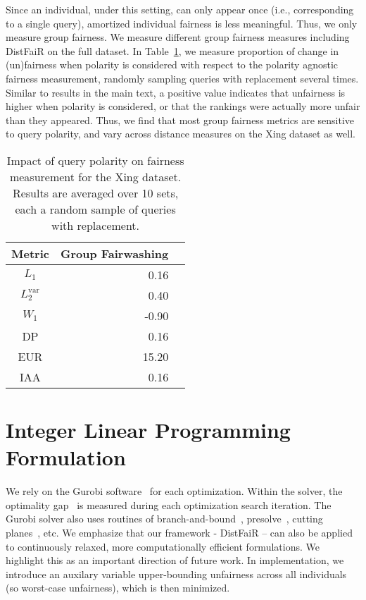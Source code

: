 Since an individual, under this setting, can only appear once (i.e., corresponding to a single query), amortized individual fairness is less meaningful. Thus, we only measure group fairness. We measure different group fairness measures including DistFaiR on the full dataset. In Table~\ref{tab:xing_dataset}, we measure proportion of change in (un)fairness when polarity is considered with respect to the polarity agnostic fairness measurement, randomly sampling queries with replacement several times.   Similar to results in the main text, a positive value indicates that unfairness is higher when polarity is considered, or that the rankings were actually more unfair than they appeared. Thus, we find that most group fairness metrics are sensitive to query polarity, and vary across distance measures on the Xing dataset as well.  

\begin{table}[!htp]\centering
\begin{tabular}{c|rr}
\toprule
\textbf{Metric} &\textbf{Group Fairwashing} \\\midrule
$L_1$ &0.16 \\
$L_2^{\text{var}}$ &0.40 \\
$W_1$ &-0.90 \\
DP &0.16 \\
EUR &15.20 \\
IAA &0.16 \\
\bottomrule
\end{tabular}
\caption{Impact of query polarity on fairness measurement for the Xing dataset. Results are averaged over 10 sets, each a random sample of queries with replacement.}\label{tab:xing_dataset}

\end{table}





\section{Integer Linear Programming Formulation}
\label{sec:ilp_appendix}
We rely on the Gurobi software~\cite{achterberg2019s} for each optimization. Within the solver, the optimality gap~\cite{bixby2007progress} is measured during each optimization search iteration. The Gurobi solver also uses routines of branch-and-bound~\cite{wolsey1999integer}, presolve~\cite{achterberg2020presolve}, cutting planes~\cite{marchand2002cutting}, etc. We emphasize that our framework - DistFaiR – can also be applied to continuously relaxed, more computationally efficient formulations. We highlight this as an important direction of future work. In implementation, we introduce an auxilary variable upper-bounding unfairness across all individuals (so worst-case unfairness), which is then minimized. 

